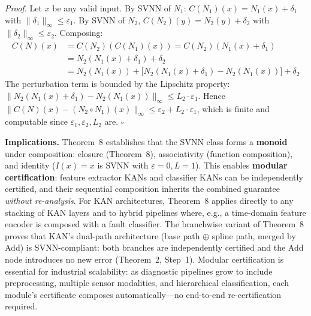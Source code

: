 \vspace{2pt}
\noindent\textit{Proof.} Let $x$ be any valid input. By SVNN of $N_1$:
$C(N_1)(x) = N_1(x) + \delta_1$ with $\|\delta_1\|_\infty \leq \varepsilon_1$.
By SVNN of $N_2$, $C(N_2)(y) = N_2(y) + \delta_2$ with
$\|\delta_2\|_\infty \leq \varepsilon_2$. Composing:
\begin{align}
C(N)(x) &= C(N_2)(C(N_1)(x))
        = C(N_2)(N_1(x) + \delta_1) \nonumber\\
        &= N_2(N_1(x) + \delta_1) + \delta_2 \nonumber\\
        &= N_2(N_1(x)) + \bigl[N_2(N_1(x)+\delta_1) - N_2(N_1(x))\bigr] + \delta_2
\end{align}
The perturbation term is bounded by the Lipschitz property:
$\|N_2(N_1(x)+\delta_1) - N_2(N_1(x))\|_\infty \leq L_2 \cdot \varepsilon_1$.
Hence $\|C(N)(x) - (N_2 \circ N_1)(x)\|_\infty \leq \varepsilon_2 + L_2 \cdot \varepsilon_1$,
which is finite and computable since $\varepsilon_1, \varepsilon_2, L_2$ are. $\square$

\vspace{2pt}
\noindent\textbf{Implications.} Theorem~8 establishes that the SVNN class forms a
\textbf{monoid} under composition: closure (Theorem~8), associativity (function
composition), and identity ($I(x)=x$ is SVNN with $\varepsilon=0, L=1$). This
enables \textbf{modular certification}: feature extractor KANs and classifier KANs
can be independently certified, and their sequential composition inherits the
combined guarantee \textit{without re-analysis}. For KAN architectures, Theorem~8
applies directly to any stacking of KAN layers and to hybrid pipelines where,
e.g., a time-domain feature encoder is composed with a fault classifier. The
branchwise variant of Theorem~8 proves that KAN's dual-path architecture
(base path $\oplus$ spline path, merged by Add) is SVNN-compliant:
both branches are independently certified and the Add node introduces no
new error (Theorem~2, Step~1). Modular certification is essential for
industrial scalability: as diagnostic pipelines grow to include preprocessing,
multiple sensor modalities, and hierarchical classification, each module's
certificate composes automatically---no end-to-end re-certification required.

